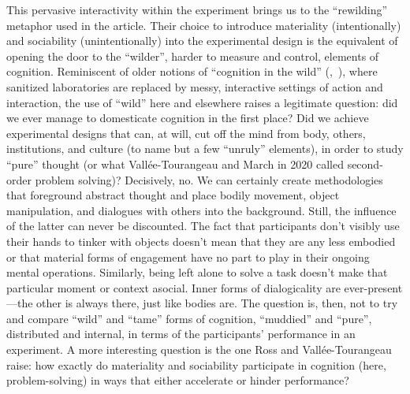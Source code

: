\documentclass[twocolumn, issue, reflection, authordate]{jote-new-article}
\begin{document}
This pervasive interactivity within the experiment brings us to the
``rewilding'' metaphor used in the article. Their choice to introduce
materiality (intentionally) and sociability (unintentionally) into the
experimental design is the equivalent of opening the door to the
``wilder'', harder to measure and control, elements of cognition.
Reminiscent of older notions of ``cognition in the wild'' (,~\citeyear{Hutchins1995}), where sanitized laboratories are replaced by messy, interactive
settings of action and interaction, the use of ``wild'' here and
elsewhere raises a legitimate question: did we ever manage to
domesticate cognition in the first place? Did we achieve experimental
designs that can, at will, cut off the mind from body, others,
institutions, and culture (to name but a few ``unruly'' elements), in
order to study ``pure'' thought (or what Vallée-Tourangeau and March in
2020 called second-order problem solving)? Decisively, no. We can
certainly create methodologies that foreground abstract thought and
place bodily movement, object manipulation, and dialogues with others
into the background. Still, the influence of the latter can never be
discounted. The fact that participants don't visibly use their hands to
tinker with objects doesn't mean that they are any less embodied or that
material forms of engagement have no part to play in their ongoing
mental operations. Similarly, being left alone to solve a task doesn't
make that particular moment or context asocial. Inner forms of
dialogicality are ever-present---the other is always there, just like
bodies are. The question is, then, not to try and compare ``wild'' and
``tame'' forms of cognition, ``muddied'' and ``pure'', distributed and
internal, in terms of the participants' performance in an experiment. A
more interesting question is the one Ross and Vallée-Tourangeau raise:
how exactly do materiality and sociability participate in cognition
(here, problem-solving) in ways that either accelerate or hinder
performance?
\end{document}
